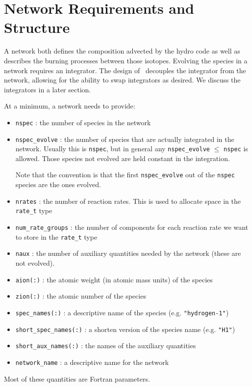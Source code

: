 

\section{Network Requirements and Structure}

A network both defines the composition advected by the hydro code as
well as describes the burning processes between those isotopes.
Evolving the species in a network requires an integrator.  The design
of \microphysics\ decouples the integrator from the network, allowing
for the ability to swap integrators as desired.  We discuss the
integrators in a later section.


At a minimum, a network needs to provide:
\begin{itemize}
 \item {\tt nspec} : the number of species in the network

 \item {\tt nspec\_evolve} : the number of species that are actually
   integrated in the network.  Usually this is {\tt nspec}, but in general
   any {\tt nspec\_evolve} $\le$ {\tt nspec} is allowed.  Those species
   not evolved are held constant in the integration.

   Note that the convention is that the first {\tt nspec\_evolve} out
   of the {\tt nspec} species are the ones evolved.

 \item {\tt nrates} : the number of reaction rates.  This is used to
   allocate space in the {\tt rate\_t} type

 \item {\tt num\_rate\_groups} : the number of components for each reaction
   rate we want to store in the {\tt rate\_t} type

 \item {\tt naux} : the number of auxiliary quantities needed by the
   network (these are not evolved).  

 \item {\tt aion(:)} : the atomic weight (in atomic mass units) of the
   species

 \item {\tt zion(:)} : the atomic number of the species

 \item {\tt spec\_names(:)} : a descriptive name of the species
   (e.g. {\tt "hydrogen-1"})

 \item {\tt short\_spec\_names(:)} : a shorten version of the species name
   (e.g. {\tt "H1"})

 \item {\tt short\_aux\_names(:)} : the names of the auxiliary quantities

 \item {\tt network\_name} : a descriptive name for the network

\end{itemize}
Most of these quantities are Fortran parameters.

